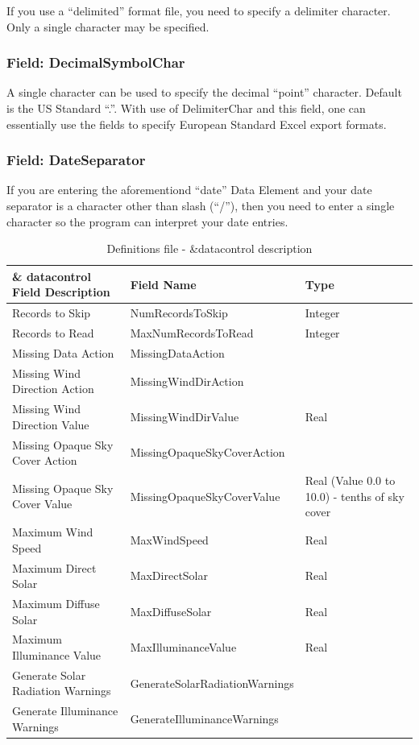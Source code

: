 If you use a ``delimited'' format file, you need to specify a delimiter character. Only a single character may be specified.

\subsubsection{Field: DecimalSymbolChar}\label{field-decimalsymbolchar}

A single character can be used to specify the decimal ``point'' character. Default is the US Standard ``.''. With use of DelimiterChar and this field, one can essentially use the fields to specify European Standard Excel export formats.

\subsubsection{Field: DateSeparator}\label{field-dateseparator}

If you are entering the aforementiond ``date'' Data Element and your date separator is a character other than slash (``/''), then you need to enter a single character so the program can interpret your date entries.

\begin{longtable}[c]{p{1.81in}p{1.65in}p{2.52in}}
\caption{Definitions file - \&datacontrol description \protect \label{table:definitions-file-datacontrol-description}}\\
\toprule 
\& datacontrol Field Description & Field Name & Type \tabularnewline \midrule
\endhead
Records to Skip & NumRecordsToSkip & Integer \tabularnewline
Records to Read & MaxNumRecordsToRead & Integer \tabularnewline
Missing Data Action & MissingDataAction &  \tabularnewline
Missing Wind Direction Action & MissingWindDirAction &  \tabularnewline
Missing Wind Direction Value & MissingWindDirValue & Real \tabularnewline
Missing Opaque Sky Cover Action & MissingOpaqueSkyCoverAction &  \tabularnewline
Missing Opaque Sky Cover Value & MissingOpaqueSkyCoverValue & Real (Value 0.0 to 10.0) - tenths of sky cover \tabularnewline
Maximum Wind Speed & MaxWindSpeed & Real \tabularnewline
Maximum Direct Solar & MaxDirectSolar & Real \tabularnewline
Maximum Diffuse Solar & MaxDiffuseSolar & Real \tabularnewline
Maximum Illuminance Value & MaxIlluminanceValue & Real \tabularnewline
Generate Solar Radiation Warnings & GenerateSolarRadiationWarnings &  \tabularnewline
Generate Illuminance Warnings & GenerateIlluminanceWarnings &  \tabularnewline
\bottomrule
\end{longtable}

